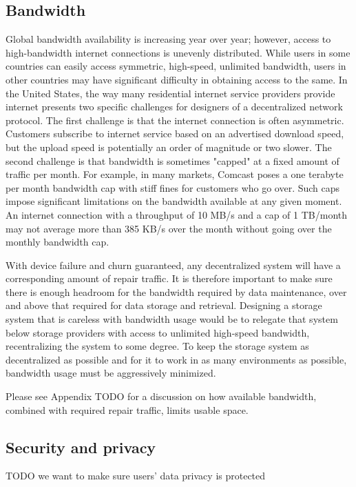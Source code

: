 \documentclass[a4paper,10pt]{article} \usepackage[utf8]{inputenc}
\newcommand{\todo}[1]{{\color{red} TODO #1 }}
\begin{document}
\subsection{Bandwidth}

Global bandwidth availability is increasing year over year; however, access to
high-bandwidth internet connections is unevenly distributed. While users in some
countries can easily access symmetric, high-speed, unlimited bandwidth, users in
other countries may have significant difficulty in obtaining access to the same.
In the United States, the way many residential internet service providers provide
internet presents two specific challenges for designers of a
decentralized network protocol. The first challenge is that the internet
connection is often asymmetric. Customers subscribe to internet service
based on an advertised download speed, but the upload speed is potentially an
order of magnitude or two slower. The second challenge is that bandwidth is
sometimes "capped" at a fixed amount of traffic per month. For example, in many
markets, Comcast poses a one terabyte per month bandwidth cap with stiff fines
for customers who go over. Such caps impose
significant limitations on the bandwidth available at any given moment.
An internet connection with a throughput of 10 MB/s and a cap of 1
TB/month may not average more than 385 KB/s over the month without going
over the monthly bandwidth cap.

With device failure and churn guaranteed, any decentralized system will have a
corresponding amount of repair traffic. It is therefore important to make sure
there is enough headroom for the bandwidth required by data maintenance, over
and above that required for data storage and retrieval. Designing a
storage system that is careless with bandwidth usage would be to relegate that
system below storage providers with access to unlimited high-speed bandwidth,
recentralizing the system to some degree. To keep the storage system as
decentralized as possible and for it to work in as many environments as
possible, bandwidth usage must be aggressively minimized.

Please see Appendix \todo{} for a discussion on how available bandwidth,
combined with required repair traffic, limits usable space.

\subsection{Security and privacy}

\todo{we want to make sure users' data privacy is protected}
\end{document}

